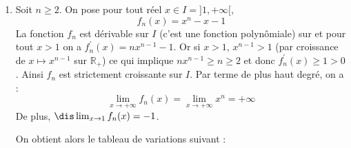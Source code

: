 \documentclass[a4paper,10pt]{report}
\begin{document}
\corr \begin{enumerate}
\item Soit $n \geq 2$. On pose pour tout réel $x \in I = ]1, + \infty[$, 
$$ f_n(x)=x^n-x-1$$
La fonction $f_n$ est dérivable sur $I$ (c'est une fonction polynômiale) sur et pour tout $x > 1$ on a $f_n^{'}(x) = nx^{n-1}-1$. Or si $x > 1$, $x^{n-1} > 1$ (par croissance de $x \mapsto x^{n-1}$ sur $\mathbb{R}_+$) ce qui implique $n x^{n-1} \geq n \geq 2$ et donc $f_n^{'}(x) \geq 1 >0$. Ainsi $f_n$ est strictement croissante sur $I$. Par terme de plus haut degré, on a :
\[ \lim_{x \rightarrow + \infty} f_n(x)  =\lim_{x \rightarrow + \infty} x^n= + \infty \]
De plus, $\dis \lim_{x \rightarrow 1} f_n(x)=-1$.

\vspace{0.2cm}

\noindent On obtient alors le tableau de variations suivant :


\end{enumerate}
\end{document}
